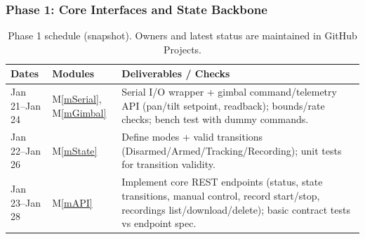 \documentclass[12pt, titlepage]{article}
\newcommand{\mref}[1]{M\ref{#1}}
\begin{document}
\subsubsection{Phase 1: Core Interfaces and State Backbone}
\renewcommand{\arraystretch}{1.15}
\begin{table}[H]
  \centering
  \begin{tabular}{|p{2.6cm}|p{5.2cm}|p{6.2cm}|}
    \hline
    \textbf{Dates}                 & \textbf{Modules} & \textbf{Deliverables / Checks} \\
    \hline
    Jan 21--Jan 24                 &
    \mref{mSerial}, \mref{mGimbal} &
    Serial I/O wrapper + gimbal command/telemetry API (pan/tilt setpoint, readback);
    bounds/rate checks; bench test with dummy commands.                                \\
    \hline
    Jan 22--Jan 26                 &
    \mref{mState}                  &
    Define modes + valid transitions (Disarmed/Armed/Tracking/Recording);
    unit tests for transition validity.                                                \\
    \hline
    Jan 23--Jan 28                 &
    \mref{mAPI}                    &
    Implement core REST endpoints (status, state transitions, manual control,
    record start/stop, recordings list/download/delete); basic contract tests
    vs endpoint spec.                                                                  \\
    \hline
  \end{tabular}
  \caption{Phase 1 schedule (snapshot). Owners and latest status are maintained in GitHub Projects.}
  \label{TblTimelineP1}
\end{table}
\end{document}
